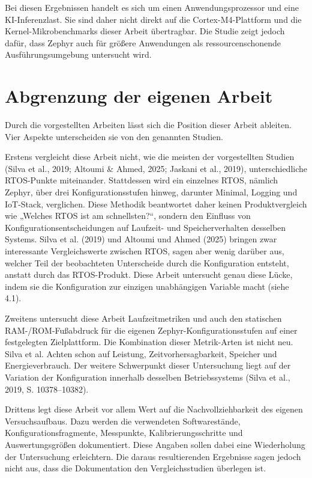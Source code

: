 Bei diesen Ergebnissen handelt es sich um einen Anwendungsprozessor und eine KI-Inferenzlast. Sie sind daher nicht direkt auf die Cortex-M4-Plattform und die Kernel-Mikrobenchmarks dieser Arbeit übertragbar. Die Studie zeigt jedoch dafür, dass Zephyr auch für größere Anwendungen als ressourcenschonende Ausführungsumgebung untersucht wird.

\section{Abgrenzung der eigenen Arbeit}
Durch die vorgestellten Arbeiten lässt sich die Position dieser Arbeit ableiten. Vier Aspekte unterscheiden sie von den genannten Studien.

Erstens vergleicht diese Arbeit nicht, wie die meisten der vorgestellten Studien (Silva et al., 2019; Altoumi \& Ahmed, 2025; Jaskani et al., 2019), unterschiedliche RTOS-Punkte miteinander. Stattdessen wird ein einzelnes RTOS, nämlich Zephyr, über drei Konfigurationsstufen hinweg, darunter Minimal, Logging und IoT-Stack, verglichen. Diese Methodik beantwortet daher keinen Produktvergleich wie „Welches RTOS ist am schnellsten?“, sondern den Einfluss von Konfigurationsentscheidungen auf Laufzeit- und Speicherverhalten desselben Systems. Silva et al. (2019) und Altoumi und Ahmed (2025) bringen zwar interessante Vergleichswerte zwischen RTOS, sagen aber wenig darüber aus, welcher Teil der beobachteten Unterscheide durch die Konfiguration entsteht, anstatt durch das RTOS-Produkt. Diese Arbeit untersucht genau diese Lücke, indem sie die Konfiguration zur einzigen unabhängigen Variable macht (siehe 4.1).

Zweitens untersucht diese Arbeit Laufzeitmetriken und auch den statischen RAM-/ROM-Fußabdruck für die eigenen Zephyr-Konfigurationsstufen auf einer festgelegten Zielplattform. Die Kombination dieser Metrik-Arten ist nicht neu. Silva et al. Achten schon auf Leistung, Zeitvorhersagbarkeit, Speicher und Energieverbrauch. Der weitere Schwerpunkt dieser Untersuchung liegt auf der Variation der Konfiguration innerhalb desselben Betriebssystems (Silva et al., 2019, S. 10378–10382).

Drittens legt diese Arbeit vor allem Wert auf die Nachvollziehbarkeit des eigenen Versuchsaufbaus. Dazu werden die verwendeten Softwarestände, Konfigurationsfragmente, Messpunkte, Kalibrierungsschritte und Auswertungsgrößen dokumentiert. Diese Angaben sollen dabei eine Wiederholung der Untersuchung erleichtern. Die daraus resultierenden Ergebnisse sagen jedoch nicht aus, dass die Dokumentation den Vergleichsstudien überlegen ist.


